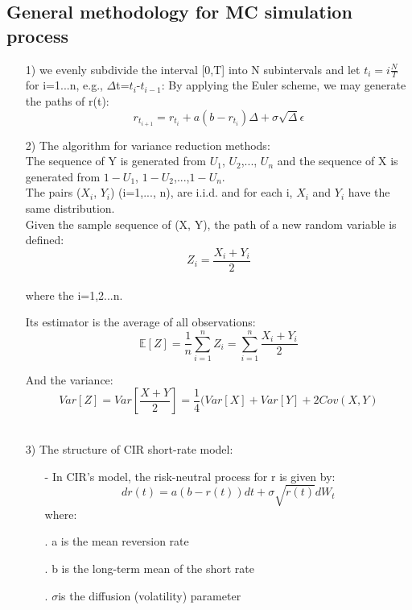 \documentclass[14pt]{extarticle}
\begin{document}
\subsection{General methodology for MC simulation process }\setlength{\baselineskip}{20pt}
\begin{itemize}
  \item [1)]  we evenly subdivide the interval [0,T] into N subintervals and let $t_i=i\frac{N}{T} $ for i=1...n, e.g., $\Delta$t=$t_i$-$t_{i-1}$:
By applying the Euler scheme, we may generate the paths of r(t):
$$ r_{t_{i+1}} =  r_{t_{i}} +a(b-r_{t_{i}} ) \Delta+\sigma\sqrt{\Delta}\epsilon $$

\item [2)]The algorithm for variance reduction methods:\\

   The sequence of Y is generated from $U_1$, $U_2$,..., $U_n$ and the sequence of X is generated from $1-U_1$,  $1-U_2$,...,$1-U_n$.\\
   
   The pairs ($X_i$, $Y_i$) (i=1,..., n), are i.i.d. and for each i, $X_i$ and $Y_i$ have the same distribution.\\
   
   Given the sample sequence of (X, Y), the path of a new random variable is defined:\\
   $$Z_i=\frac{X_i+Y_i}{2} $$\\
   where the i=1,2...n.
   
   Its estimator is the average of all observations:\\
   $$\mathbb{E}[Z]=\frac{1}{n}\sum_{i = 1}^{n}Z_i =\sum_{i = 1}^{n}\frac{X_i+Y_i}{2} $$
   
   And the variance:
   $$Var[Z]=Var[\frac{X+Y}{2}]=\frac{1}{4}(Var[X]+Var[Y]+2Cov(X,Y) $$\\
   

\item [3)]The structure of CIR short-rate model:

\begin{itemize}
\item[-] In CIR’s model, the risk-neutral process for r is given by:
$$ dr(t)=a(b-r(t))dt+\sigma\sqrt{r(t)}dW_t  $$
where:
\item[.]a is the mean reversion rate
\item[.]b is the long-term mean of the short rate
\item[.] $\sigma$is the diffusion (volatility) parameter\\
\end{itemize}


\end{itemize}
\end{document}
